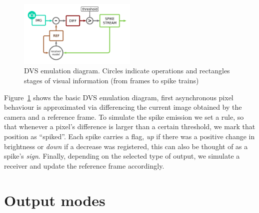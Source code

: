 \documentclass[twocolumn, a4paper]{article}
\begin{document}
%
\begin{figure}[htb]
  \includegraphics[width=0.5\textwidth]{dvs_emu}
  
  \caption{DVS emulation diagram. Circles indicate operations and rectangles stages of visual information (from frames to spike trains)}
  \label{fig:dvs_emu}
\end{figure}

Figure~\ref{fig:dvs_emu} shows the basic DVS emulation diagram, first asynchronous pixel behaviour is approximated via differencing the current image obtained by the camera and a reference frame. To simulate the spike emission we set a rule, so that whenever a pixel's difference is larger than a certain threshold, we mark that position as ``spiked''. Each spike carries a flag, \textit{up} if there was a positive change in brightness or \textit{down} if a decrease was registered, this can also be thought of as a spike's \textit{sign}. Finally, depending on the selected type of output, we simulate a receiver and update the reference frame accordingly. 


\section{Output modes}
\label{sec:output-modes}
\end{document}
